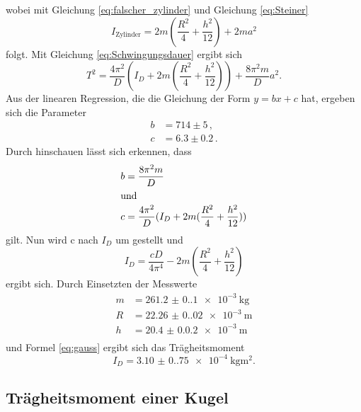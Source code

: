 wobei mit Gleichung \eqref{eq:falscher_zylinder} und Gleichung \eqref{eq:Steiner}
    \begin{equation}
    I_{\text{Zylinder}} = 2m(\frac{R^2}{4}+\frac{h^2}{12})+2ma^2
  \end{equation}
  folgt.
Mit Gleichung \ref{eq:Schwingungsdauer} ergibt sich
  \begin{equation}
    T^2 = \frac{4 \pi^2}{D}(I_D + 2m(\frac{R^2}{4}+\frac{h^2}{12}))+\frac{8 \pi^2 m}{D}a^2.
    \label{equ:T^2}
  \end{equation}
Aus der linearen Regression, die die Gleichung der Form $y = b x + c$ hat, ergeben sich die Parameter
  \begin{align*}
    b &= 714 \pm 5\,, \\
    c &= 6.3 \pm 0.2\,.
  \end{align*}
Durch hinschauen lässt sich erkennen, dass
  \begin{align*}
    b &= \frac{8 \pi^2 m}{D}\\
    \intertext{und}
    c &= \frac{4 \pi^2}{D}(I_D + 2m(\frac{R^2}{4}+\frac{h^2}{12}))
  \end{align*}
  gilt.
  Nun wird c nach $I_D$ um gestellt und
  \begin{equation}
    I_D = \frac{cD}{4\pi^4}- 2m(\frac{R^2}{4}+\frac{h^2}{12})
  \end{equation}
  ergibt sich.
  Durch Einsetzten der Messwerte
  \begin{align*}
    m &= \SI{261.2(0.1)e-3}{\kilogram} \\
    R &= \SI{22.26(0.02)e-3}{\meter}\\
    h &= \SI{20.4(0.02)e-3}{\meter}\\
  \end{align*}
  und Formel \ref{eq:gauss} ergibt sich das Trägheitsmoment
  \begin{equation*}
    I_D = \SI{3.10(0.75)e-4}{\kilogram \meter\squared}.
  \end{equation*}

  
\subsection{Trägheitsmoment einer Kugel}


